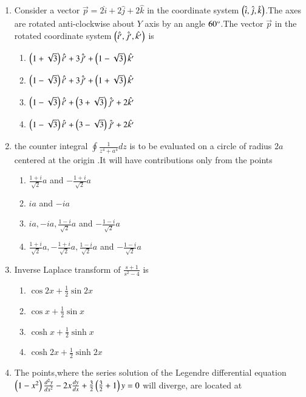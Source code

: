 \documentclass[journal]{IEEEtran}
\begin{document}
\begin{enumerate}[start=18]
\begin{enumerate}
    \end{enumerate}
    \item Consider a vector $\Vec{p}=
    2\hat{i}+2\hat{j}+2\hat{k}$ in the coordinate system $\left(\hat{i},\hat{j},\hat{k}\right)$.The axes are rotated anti-clockwise about $Y$ axis by an angle $60\degree$.The vector $\Vec{p}$ in the rotated coordinate system $\left(\hat{i^\prime},\hat{j^\prime},\hat{k^\prime}\right)$ is
    \begin{enumerate}
        \item $\left(1+\sqrt{3}\right)\hat{i^\prime}+3\hat{j^\prime}+\left(1-\sqrt{3}\right)\hat{k^\prime}$
        \item $\left(1-\sqrt{3}\right)\hat{i^\prime}+3\hat{j^\prime}+\left(1+\sqrt{3}\right)\hat{k^\prime}$
        \item $\left(1-\sqrt{3}\right)\hat{i^\prime}+\left(3+\sqrt{3}\right)\hat{j^\prime}+2\hat{k^\prime}$
        \item $\left(1-\sqrt{3}\right)\hat{i^\prime}+\left(3-\sqrt{3}\right)\hat{j^\prime}+2\hat{k^\prime}$
    \end{enumerate}
    \item the counter integral $\oint \frac{1}{z^4+a^4}dz$ is to be evaluated on a circle of radius $2a$ centered at the origin .It will have contributions only from the points
    \begin{enumerate}
        \item $\frac{1+i}{\sqrt{2}}a$ and $-\frac{1+i}{\sqrt{2}}a$
        \item $ia$ and $-ia$
        \item $ia,-ia,\frac{1-i}{\sqrt{2}}a$ and $-\frac{1-i}{\sqrt{2}}a$
        \item $\frac{1+i}{\sqrt{2}}a,-\frac{1+i}{\sqrt{2}}a,\frac{1-i}{\sqrt{2}}a$ and $-\frac{1-i}{\sqrt{2}}a$
    \end{enumerate}
    \item Inverse Laplace transform of $\frac{s+1}{s^2-4}$ is
    \begin{enumerate}
        \item $\cos{2x}+\frac{1}{2}\sin{2x}$
        \item $\cos{x}+\frac{1}{2}\sin{x}$
        \item $\cosh{x}+\frac{1}{2}\sinh{x}$
        \item $\cosh{2x}+\frac{1}{2}\sinh{2x}$
    \end{enumerate}
    \item The points,where the series solution of the Legendre differential equation $\left(1-x^2\right)\frac{d^2 y}{dx^2}-2x\frac{dy}{dx}+\frac{3}{2}\left(\frac{3}{2}+1\right)y=0$ will diverge, are located at

\end{enumerate}
\end{document}
